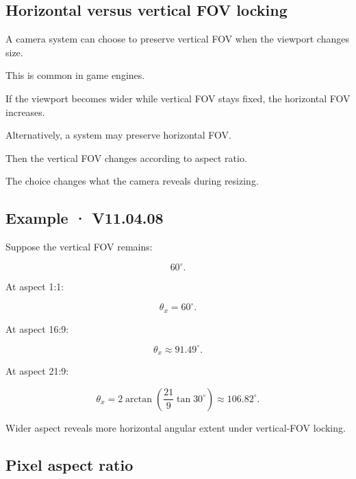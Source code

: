 \subsection{Horizontal versus vertical FOV locking}\label{02-foundations-ii-ch033-horizontal-versus-vertical-fov-locking}

\hypertarget{02-foundations-ii-ch033-horizontal-versus-vertical-fov-locking}{}

A camera system can choose to preserve vertical FOV when the viewport changes size.

This is common in game engines.

If the viewport becomes wider while vertical FOV stays fixed, the horizontal FOV increases.

Alternatively, a system may preserve horizontal FOV.

Then the vertical FOV changes according to aspect ratio.

The choice changes what the camera reveals during resizing.

\begin{allmightroleexample}

\subsection{Example · V11.04.08}\label{02-foundations-ii-ch033-example-v11.04.08}

\hypertarget{02-foundations-ii-ch033-example-v11.04.08}{}

Suppose the vertical FOV remains:

\end{allmightroleexample}

\[
 60^\circ.
\]

At aspect 1:1:

\[
 \theta_x=60^\circ.
\]

At aspect 16:9:

\[
 \theta_x\approx91.49^\circ.
\]

At aspect 21:9:

\[
 \theta_x= 2\arctan\left(\frac{21}{9}\tan30^\circ\right) \approx106.82^\circ.
\]

Wider aspect reveals more horizontal angular extent under vertical-FOV locking.

\subsection{Pixel aspect ratio}\label{02-foundations-ii-ch033-pixel-aspect-ratio}

